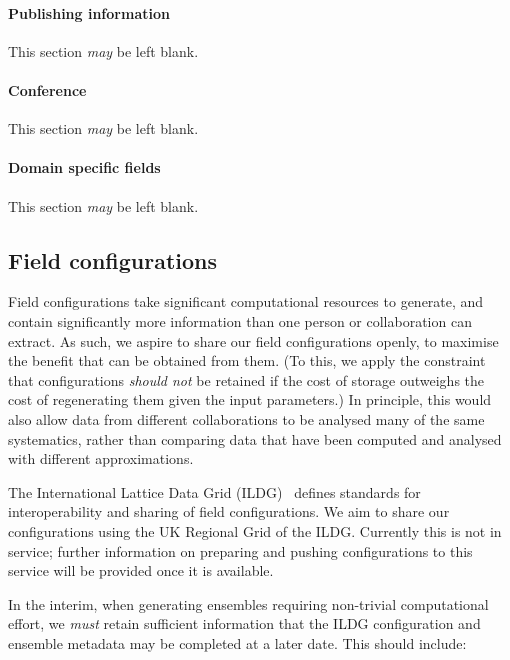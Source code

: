 \documentclass{article}
\newcommand\rfcword[1]{\emph{#1}\xspace}
\newcommand\must{\rfcword{must}}
\newcommand\shouldnot{\rfcword{should not}}
\newcommand\may{\rfcword{may}}
\begin{document}
\paragraph{Publishing information}

This section \may be left blank.

\paragraph{Conference}

This section \may be left blank.

\paragraph{Domain specific fields}

This section \may be left blank.


\subsection{Field configurations}

Field configurations take significant computational resources to generate,
and contain significantly more information than one person or collaboration can extract.
As such,
we aspire to share our field configurations openly,
to maximise the benefit that can be obtained from them.
(To this,
we apply the constraint that
configurations \shouldnot be retained if the cost of storage outweighs
the cost of regenerating them given the input parameters.)
In principle,
this would also allow data from different collaborations
to be analysed many of the same systematics,
rather than comparing data that have been computed and analysed with different approximations.

The International Lattice Data Grid (ILDG)~\cite{ildg-organization}
defines standards for interoperability and sharing of field configurations.
We aim to share our configurations using the UK Regional Grid of the ILDG\@.
Currently this is not in service;
further information on preparing and pushing configurations to this service
will be provided once it is available.

In the interim,
when generating ensembles requiring non-trivial computational effort,
we \must retain sufficient information that
the ILDG configuration and ensemble metadata may be completed at a later date.
This should include:
\end{document}
